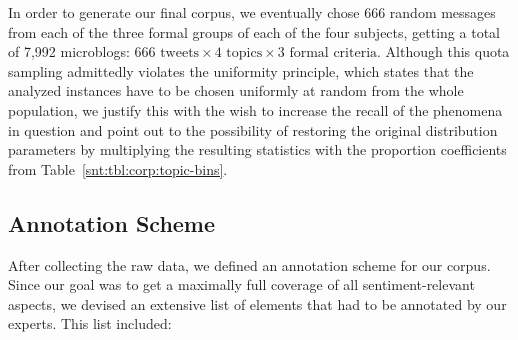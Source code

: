 
In order to generate our final corpus, we eventually chose 666 random
messages from each of the three formal groups of each of the four
subjects, getting a total of 7,992 microblogs: $666\text{ tweets}
\times 4\text{ topics} \times 3\text{ formal criteria}$.  Although
this quota sampling admittedly violates the uniformity principle,
which states that the analyzed instances have to be chosen uniformly
at random from the whole population, we justify this with the wish to
increase the recall of the phenomena in question and point out to the
possibility of restoring the original distribution parameters by
multiplying the resulting statistics with the proportion coefficients
from Table~\ref{snt:tbl:corp:topic-bins}.

\subsection{Annotation Scheme}\label{subsec:snt:ascheme}
After collecting the raw data, we defined an annotation scheme for our
corpus. Since our goal was to get a maximally full coverage of all
sentiment-relevant aspects, we devised an extensive list of elements
that had to be annotated by our experts.  This list included:

